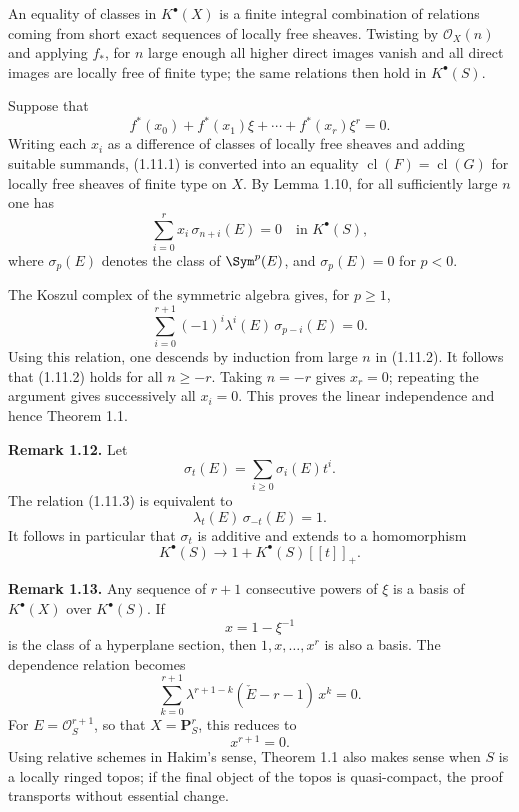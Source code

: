\documentclass[11pt]{article}
\newcommand{\cl}{\operatorname{cl}}
\begin{document}
An equality of classes in \(K^\bullet(X)\) is a finite integral combination of relations coming from short exact sequences of locally free sheaves. Twisting by \(\mathcal O_X(n)\) and applying \(f_*\), for \(n\) large enough all higher direct images vanish and all direct images are locally free of finite type; the same relations then hold in \(K^\bullet(S)\).

Suppose that
\begin{equation}\tag{1.11.1}
  f^*(x_0)+f^*(x_1)\xi+\cdots+f^*(x_r)\xi^r=0 .
\end{equation}
Writing each \(x_i\) as a difference of classes of locally free sheaves and adding suitable summands, (1.11.1) is converted into an equality \(\cl(F)=\cl(G)\) for locally free sheaves of finite type on \(X\). By Lemma 1.10, for all sufficiently large \(n\) one has
\begin{equation}\tag{1.11.2}
  \sum_{i=0}^{r} x_i\,\sigma_{n+i}(E)=0
  \quad\text{in }K^\bullet(S),
\end{equation}
where \(\sigma_p(E)\) denotes the class of \(\Sym^p(E)\), and \(\sigma_p(E)=0\) for \(p<0\).

The Koszul complex of the symmetric algebra gives, for \(p\geq 1\),
\begin{equation}\tag{1.11.3}
  \sum_{i=0}^{r+1}(-1)^i\lambda^i(E)\,\sigma_{p-i}(E)=0 .
\end{equation}
Using this relation, one descends by induction from large \(n\) in (1.11.2). It follows that (1.11.2) holds for all \(n\geq -r\). Taking \(n=-r\) gives \(x_r=0\); repeating the argument gives successively all \(x_i=0\). This proves the linear independence and hence Theorem 1.1.

\textbf{Remark 1.12.} Let
\[
  \sigma_t(E)=\sum_{i\geq 0}\sigma_i(E)t^i .
\]
The relation (1.11.3) is equivalent to
\[
  \lambda_t(E)\,\sigma_{-t}(E)=1.
\]
It follows in particular that \(\sigma_t\) is additive and extends to a homomorphism
\[
  K^\bullet(S)\longrightarrow 1+K^\bullet(S)[[t]]_+ .
\]

\textbf{Remark 1.13.} Any sequence of \(r+1\) consecutive powers of \(\xi\) is a basis of \(K^\bullet(X)\) over \(K^\bullet(S)\). If
\[
  x=1-\xi^{-1}
\]
is the class of a hyperplane section, then \(1,x,\ldots,x^r\) is also a basis. The dependence relation becomes
\begin{equation}\tag{1.13.1}
  \sum_{k=0}^{r+1}\lambda^{r+1-k}(\check E-r-1)\,x^k=0.
\end{equation}
For \(E=\mathcal O_S^{r+1}\), so that \(X=\mathbf P^r_S\), this reduces to
\[
  x^{r+1}=0.
\]
Using relative schemes in Hakim's sense, Theorem 1.1 also makes sense when \(S\) is a locally ringed topos; if the final object of the topos is quasi-compact, the proof transports without essential change.
\end{document}

